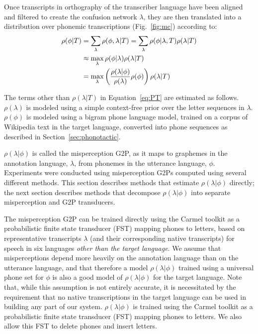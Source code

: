 Once transcripts in orthography of the transcriber language have been
aligned and filtered to create the confusion network $\lambda$, they
are then translated into a distribution over phonemic transcriptions
(Fig.~\ref{fig:mc}) according to:
\begin{align}
  \rho(\phi|T) &=
  \sum_{\lambda} \rho(\phi, \lambda|T) =
  \sum_{\lambda} \rho(\phi|\lambda,T) \rho(\lambda|T) \notag \\
  &\approx \max_{\lambda}  \rho(\phi|\lambda) \rho(\lambda|T) \notag \\
  &= \max_{\lambda}  \left(\frac{\rho(\lambda|\phi)}{\rho(\lambda)}
  \rho(\phi)\right) \rho(\lambda|T) 
\label{eq:PT}
\end{align}

The terms other than $\rho(\lambda|T)$ in Equation~\ref{eq:PT} are
estimated as follows.  $\rho(\lambda)$ is modeled using a simple
context-free prior over the letter sequences in $\lambda$.
$\rho(\phi)$ is modeled using a bigram phone language model, trained
on a corpus of Wikipedia text in the target language, converted into
phone sequences as described in Section~\ref{sec:phonotactic}.

$\rho(\lambda|\phi)$ is called the misperception G2P, as it maps to
graphemes in the annotation language, $\lambda$, from phonemes in the
utterance language, $\phi$.  Experiments were conducted using
misperception G2Ps computed using several different methods.  This
section describes methods that estimate $\rho(\lambda|\phi)$ directly;
the next section describes methods that decompose $\rho(\lambda|\phi)$
into separate misperception and G2P transducers.

The misperception G2P can be trained directly using the Carmel toolkit
\cite{Carmel} as a probabilistic finite state transducer (FST) mapping
phones to letters, based on representative transcripts $\lambda$ (and
their corresponding native transcripts) for speech in six languages
{\em other than the target language}. We assume that misperceptions
depend more heavily on the annotation language than on the utterance
language, and that therefore a model $\rho(\lambda|\phi)$ trained
using a universal phone set for $\phi$ is also a good model of
$\rho(\lambda|\phi)$ for the target language. Note that, while this
assumption is not entirely accurate, it is necessitated by the
requirement that no native transcriptions in the target language can
be used in building any part of our system.  $\rho(\lambda|\phi)$ is
trained using the Carmel toolkit \cite{Carmel} as a probabilistic
finite state transducer (FST) mapping phones to letters. We also allow
this FST to delete phones and insert letters.

